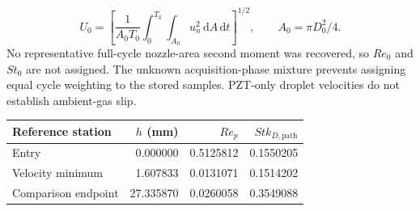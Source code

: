 \begin{equation} U_0=\left[\frac{1}{A_0T_0}\int_0^{T_0}\int_{A_0}u_n^2\,\mathrm dA\,\mathrm dt\right]^{1/2},\qquad A_0=\pi D_0^2/4.\end{equation}
No representative full-cycle nozzle-area second moment was recovered, so $Re_0$ and $St_0$ are not assigned.
The unknown acquisition-phase mixture prevents assigning equal cycle weighting to the stored samples.
PZT-only droplet velocities do not establish ambient-gas slip.

\begin{center}\begin{tabular}{lrrr}\hline
Reference station & $h$ (mm) & $Re_p$ & $Stk_{D,\mathrm{path}}$ \\
\hline
Entry & 0.000000 & 0.5125812 & 0.1550205 \\
Velocity minimum & 1.607833 & 0.0131071 & 0.1514202 \\
Comparison endpoint & 27.335870 & 0.0260058 & 0.3549088 \\
\hline\end{tabular}\end{center}
